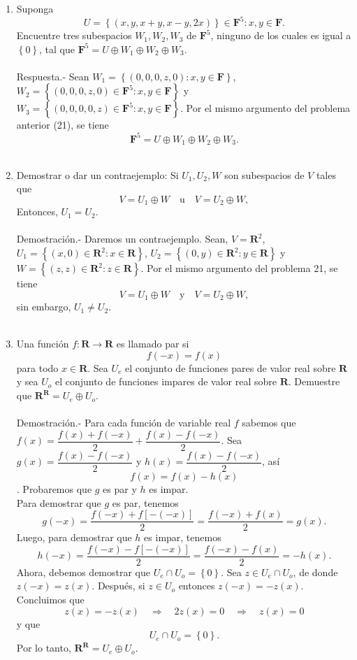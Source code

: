 \begin{enumerate}[\bfseries 1.]
    \item Suponga
    $$U=\left\{(x,y,x+y,x-y,2x)\right\}\in \textbf{F}^5: x,y \in \textbf{F}.$$
    Encuentre tres subespacios $W_1,W_2,W_3$ de $\textbf{F}^5$, ninguno de los cuales es igual a $\left\{0\right\}$, tal que $\textbf{F}^5=U\oplus W_1\oplus W_2 \oplus W_3.$\\\\
	Respuesta.-\; Sean $W_1=\left\{(0,0,0,z,0):x,y\in \textbf{F}\right\}$, $W_2=\left\{(0,0,0,z,0)\in \textbf{F}^5:x,y\in \textbf{F}\right\}$ y $W_3=\left\{(0,0,0,0,z)\in \textbf{F}^5:x,y\in \textbf{F}\right\}$. Por el mismo argumento del problema anterior (21), se tiene
	$$\textbf{F}^5=U\oplus W_1 \oplus W_2 \oplus W_3.$$\\

    \item Demostrar o dar un contraejemplo: Si $U_1,U_2,W$ son subespacios de $V$ tales que 
    $$V=U_1\oplus W \quad \mbox{u} \quad V=U_2\oplus W,$$
    Entonces, $U_1=U_2.$\\\\
    Demostración.-\; Daremos un contraejemplo. Sean, $V=\textbf{R}^2$, $U_1=\left\{(x,0)\in \textbf{R}^2:x\in \textbf{R}\right\}$, $U_2=\left\{(0,y)\in \textbf{R}^2:y\in \textbf{R}\right\}$ y $W=\left\{(z,z)\in \textbf{R}^2:z\in \textbf{R}\right\}$. Por el mismo argumento del problema 21, se tiene 
    $$V=U_1\oplus W\quad \mbox{y}\quad V=U_2\oplus W,$$
    sin embargo, $U_1\neq U_2$.\\\\

    \item Una función $f:\textbf{R}\to \textbf{R}$ es llamado par si
    $$f(-x)=f(x)$$
    para todo $x\in \textbf{R}.$ Sea $U_e$ el conjunto de funciones pares de valor real sobre $\textbf{R}$ y sea $U_o$ el conjunto de funciones impares de valor real sobre $\textbf{R}$. Demuestre que $\textbf{R}^{\textbf{R}}=U_e \oplus U_o.$\\\\
    Demostración.-\; Para cada función de variable real $f$ sabemos que $f(x)=\dfrac{f(x)+f(-x)}{2}+\dfrac{f(x)-f(-x)}{2}$. Sea $g(x)=\dfrac{f(x)-f(-x)}{2}$ y $h(x)=\dfrac{f(x)-f(-x)}{2}$, así
    $$f(x)=f(x)-h(x)$$. Probaremos que $g$ es par y $h$ es impar.\\
    Para demostrar que $g$ es par, tenemos
    $$g(-x)=\dfrac{f(-x)+f\left[-(-x)\right]}{2}=\dfrac{f(-x)+f(x)}{2}=g(x).$$
    Luego, para demostrar que $h$ es impar, tenemos
    $$h(-x)=\dfrac{f(-x)-f\left[-(-x)\right]}{2}=\dfrac{f(-x)-f(x)}{2}=-h(x).$$
    Ahora, debemos demostrar que $U_e\cap U_o=\left\{0\right\}$. Sea $z\in U_e\cap U_o$, de donde $z(-x)=z(x)$. Después, si $z\in U_o$ entonces $z(-x)=-z(x)$. Concluimos que 
    $$z(x)=-z(x)\quad \Rightarrow \quad 2z(x)=0\quad \Rightarrow \quad z(x)=0$$
    y que 
    $$U_e\cap U_o=\left\{0\right\}.$$
    Por lo tanto, $\textbf{R}^{\textbf{R}}=U_e\oplus U_o$.

\end{enumerate}



